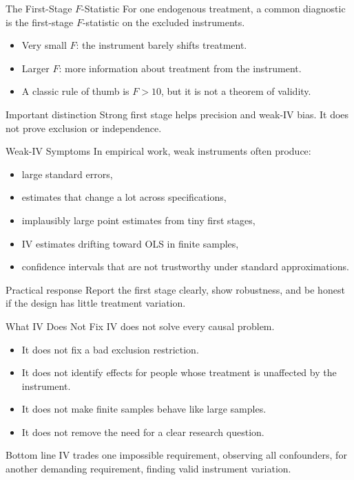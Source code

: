 \documentclass[11pt,aspectratio=169]{beamer}
\begin{document}
\begin{frame}{The First-Stage \(F\)-Statistic}
  For one endogenous treatment, a common diagnostic is the first-stage \(F\)-statistic on the excluded instruments.

  \begin{itemize}
    \item Very small \(F\): the instrument barely shifts treatment.
    \item Larger \(F\): more information about treatment from the instrument.
    \item A classic rule of thumb is \(F>10\), but it is not a theorem of validity.
  \end{itemize}

  \begin{block}{Important distinction}
    Strong first stage helps precision and weak-IV bias. It does not prove exclusion or independence.
  \end{block}
\end{frame}

\begin{frame}{Weak-IV Symptoms}
  In empirical work, weak instruments often produce:
  \begin{itemize}
    \item large standard errors,
    \item estimates that change a lot across specifications,
    \item implausibly large point estimates from tiny first stages,
    \item IV estimates drifting toward OLS in finite samples,
    \item confidence intervals that are not trustworthy under standard approximations.
  \end{itemize}

  \begin{block}{Practical response}
    Report the first stage clearly, show robustness, and be honest if the design has little treatment variation.
  \end{block}
\end{frame}

\begin{frame}{What IV Does Not Fix}
  IV does not solve every causal problem.

  \begin{itemize}
    \item It does not fix a bad exclusion restriction.
    \item It does not identify effects for people whose treatment is unaffected by the instrument.
    \item It does not make finite samples behave like large samples.
    \item It does not remove the need for a clear research question.
  \end{itemize}

  \begin{block}{Bottom line}
    IV trades one impossible requirement, observing all confounders, for another demanding requirement, finding valid instrument variation.
  \end{block}
\end{frame}
\end{document}
